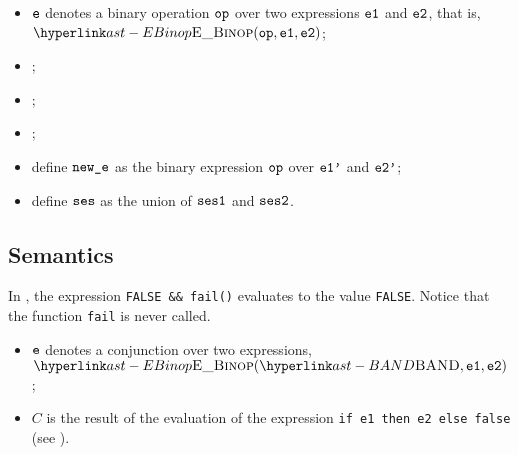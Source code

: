 \ProseParagraph
\AllApply
\begin{itemize}
  \item $\ve$ denotes a binary operation $\op$ over two expressions $\veone$ and $\vetwo$, that is, \\ $\EBinop(\op, \veone, \vetwo)$;
  \item \Proseannotateexpr{$\tenv$}{$\veone$}{\\ $(\vtone, \veonep, \vsesone)$\ProseOrTypeError};
  \item \Proseannotateexpr{$\tenv$}{$\vetwo$}{\\ $(\vttwo, \vetwop, \vsestwo)$\ProseOrTypeError};
  \item \Proseapplybinoptypes{$\tenv$}{\op}{\vtone}{\vttwo}{$\vt$\ProseOrTypeError};
  \item define $\newe$ as the binary expression $\op$ over $\veonep$ and $\vetwop$;
  \item define $\vses$ as the union of $\vsesone$ and $\vsestwo$.
\end{itemize}

\FormallyParagraph
\begin{mathpar}
\end{mathpar}

\subsection{Semantics}
In ,
the expression \texttt{FALSE \&\& fail()} evaluates to the value \texttt{FALSE}. Notice that the function \texttt{fail} is never called.

\ProseParagraph
\AllApply
\begin{itemize}
\item $\ve$ denotes a conjunction over two expressions,
      $\EBinop(\BAND, \veone, \vetwo)$;
\item $C$ is the result of the evaluation of the expression
      \texttt{if e1 then e2 else false} (see ).
\end{itemize}

